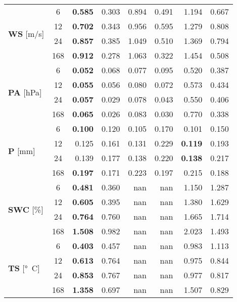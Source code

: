 \begin{table}
\begin{tabular}{p{2.1cm}c|rr|rr|rr}
\cline{1-8}
\multirow[c]{4}{*}{\parbox{2.1cm}{\textbf{WS} [\si{m/s}]}} & 6 & \bfseries 0.585 & 0.303 & 0.894 & 0.491 & 1.194 & 0.667 \\
 & 12 & \bfseries 0.702 & 0.343 & 0.956 & 0.595 & 1.279 & 0.808 \\
 & 24 & \bfseries 0.857 & 0.385 & 1.049 & 0.510 & 1.369 & 0.794 \\
 & 168 & \bfseries 0.912 & 0.278 & 1.063 & 0.322 & 1.454 & 0.508 \\
\cline{1-8}
\multirow[c]{4}{*}{\parbox{2.1cm}{\textbf{PA} [\si{hPa}]}} & 6 & \bfseries 0.052 & 0.068 & 0.077 & 0.095 & 0.520 & 0.387 \\
 & 12 & \bfseries 0.055 & 0.056 & 0.080 & 0.072 & 0.573 & 0.434 \\
 & 24 & \bfseries 0.057 & 0.029 & 0.078 & 0.043 & 0.550 & 0.406 \\
 & 168 & \bfseries 0.065 & 0.026 & 0.083 & 0.030 & 0.770 & 0.338 \\
\cline{1-8}
\multirow[c]{4}{*}{\parbox{2.1cm}{\textbf{P} [\si{mm}]}} & 6 & \bfseries 0.100 & 0.120 & 0.105 & 0.170 & 0.101 & 0.150 \\
 & 12 & 0.125 & 0.161 & 0.131 & 0.229 & \bfseries 0.119 & 0.193 \\
 & 24 & 0.139 & 0.177 & 0.138 & 0.220 & \bfseries 0.138 & 0.217 \\
 & 168 & \bfseries 0.197 & 0.171 & 0.223 & 0.197 & 0.215 & 0.188 \\
\cline{1-8}
\multirow[c]{4}{*}{\parbox{2.1cm}{\textbf{SWC} [\si{\%}]}} & 6 & \bfseries 0.481 & 0.360 & nan & nan & 1.150 & 1.287 \\
 & 12 & \bfseries 0.605 & 0.395 & nan & nan & 1.380 & 1.629 \\
 & 24 & \bfseries 0.764 & 0.760 & nan & nan & 1.665 & 1.714 \\
 & 168 & \bfseries 1.508 & 0.982 & nan & nan & 2.023 & 1.493 \\
\cline{1-8}
\multirow[c]{4}{*}{\parbox{2.1cm}{\textbf{TS} [\si{°C}]}} & 6 & \bfseries 0.403 & 0.457 & nan & nan & 0.983 & 1.113 \\
 & 12 & \bfseries 0.613 & 0.764 & nan & nan & 0.975 & 0.844 \\
 & 24 & \bfseries 0.853 & 0.767 & nan & nan & 0.977 & 0.817 \\
 & 168 & \bfseries 1.358 & 0.697 & nan & nan & 1.507 & 0.829 \\
\cline{1-8}
\bottomrule
\end{tabular}
\end{table}
